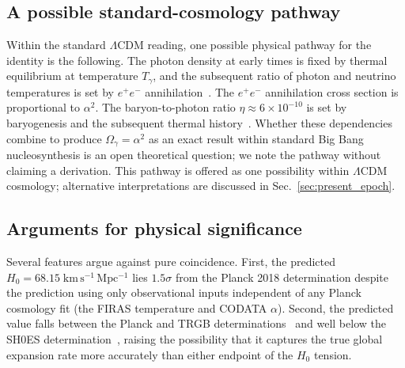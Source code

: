 \documentclass[12pt, a4paper]{article}
\begin{document}
\subsection{A possible standard-cosmology pathway}
\label{sec:bbn_pathway}

Within the standard $\Lambda$CDM reading, one possible physical pathway for the identity is the following. The photon density at early times is fixed by thermal equilibrium at temperature $T_\gamma$, and the subsequent ratio of photon and neutrino temperatures is set by $e^+e^-$ annihilation~\cite{kolb_turner_1990}. The $e^+e^-$ annihilation cross section is proportional to $\alpha^2$. The baryon-to-photon ratio $\eta \approx 6 \times 10^{-10}$ is set by baryogenesis and the subsequent thermal history~\cite{steigman_2007}. Whether these dependencies combine to produce $\Omega_\gamma = \alpha^2$ as an exact result within standard Big Bang nucleosynthesis is an open theoretical question; we note the pathway without claiming a derivation. This pathway is offered as one possibility within $\Lambda$CDM cosmology; alternative interpretations are discussed in Sec.~\ref{sec:present_epoch}.


\subsection{Arguments for physical significance}
\label{sec:arguments_for}

Several features argue against pure coincidence. First, the predicted $H_0 = 68.15\;\mathrm{km\,s^{-1}\,Mpc^{-1}}$ lies $1.5\sigma$ from the Planck 2018 determination despite the prediction using only observational inputs independent of any Planck cosmology fit (the FIRAS temperature and CODATA $\alpha$). Second, the predicted value falls between the Planck and TRGB determinations~\cite{freedman_2021} and well below the SH0ES determination~\cite{riess_2022}, raising the possibility that it captures the true global expansion rate more accurately than either endpoint of the $H_0$ tension.
\end{document}

